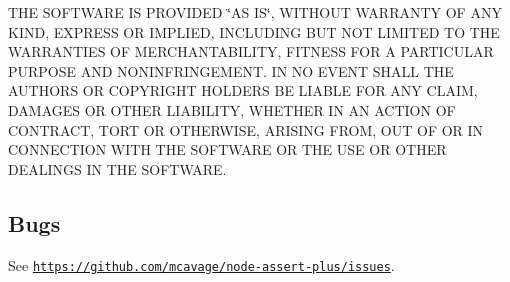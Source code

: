 T\+HE S\+O\+F\+T\+W\+A\+RE IS P\+R\+O\+V\+I\+D\+ED \char`\"{}\+A\+S I\+S\char`\"{}, W\+I\+T\+H\+O\+UT W\+A\+R\+R\+A\+N\+TY OF A\+NY K\+I\+ND, E\+X\+P\+R\+E\+SS OR I\+M\+P\+L\+I\+ED, I\+N\+C\+L\+U\+D\+I\+NG B\+UT N\+OT L\+I\+M\+I\+T\+ED TO T\+HE W\+A\+R\+R\+A\+N\+T\+I\+ES OF M\+E\+R\+C\+H\+A\+N\+T\+A\+B\+I\+L\+I\+TY, F\+I\+T\+N\+E\+SS F\+OR A P\+A\+R\+T\+I\+C\+U\+L\+AR P\+U\+R\+P\+O\+SE A\+ND N\+O\+N\+I\+N\+F\+R\+I\+N\+G\+E\+M\+E\+NT. IN NO E\+V\+E\+NT S\+H\+A\+LL T\+HE A\+U\+T\+H\+O\+RS OR C\+O\+P\+Y\+R\+I\+G\+HT H\+O\+L\+D\+E\+RS BE L\+I\+A\+B\+LE F\+OR A\+NY C\+L\+A\+IM, D\+A\+M\+A\+G\+ES OR O\+T\+H\+ER L\+I\+A\+B\+I\+L\+I\+TY, W\+H\+E\+T\+H\+ER IN AN A\+C\+T\+I\+ON OF C\+O\+N\+T\+R\+A\+CT, T\+O\+RT OR O\+T\+H\+E\+R\+W\+I\+SE, A\+R\+I\+S\+I\+NG F\+R\+OM, O\+UT OF OR IN C\+O\+N\+N\+E\+C\+T\+I\+ON W\+I\+TH T\+HE S\+O\+F\+T\+W\+A\+RE OR T\+HE U\+SE OR O\+T\+H\+ER D\+E\+A\+L\+I\+N\+GS IN T\+HE S\+O\+F\+T\+W\+A\+RE.

\subsection*{Bugs}

See \href{https://github.com/mcavage/node-assert-plus/issues}{\tt https\+://github.\+com/mcavage/node-\/assert-\/plus/issues}. 